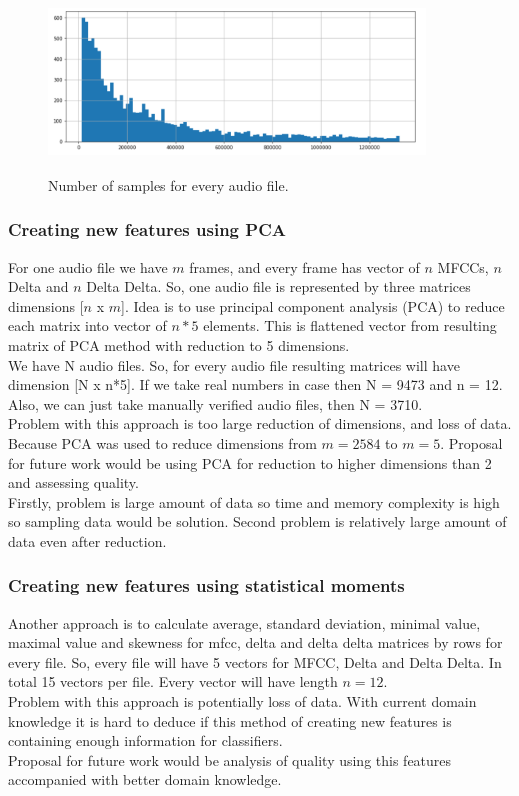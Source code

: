 \documentclass{article}
\begin{document}
\begin{figure}[!htb]
\includegraphics[width=10cm, height=4cm]{noOfSamples}\\
\caption{Number of samples for every audio file.}
\label{fig:distrSamplAudio}
\centering
\end{figure}


\subsubsection{Creating new features using PCA}
For one audio file we have $m$ frames, and every frame has vector of $n$ MFCCs, $n$ Delta and $n$ Delta Delta. So, one 
audio file is represented by three matrices dimensions [$n$ x $m$]. Idea is to use principal component analysis (PCA) to 
reduce each matrix into vector of $n*5$ elements. This is flattened vector from resulting matrix of PCA method with reduction 
to 5 dimensions.\\
We have N audio files. So, for every audio file resulting matrices will have dimension [N x n*5]. If we take real numbers 
in case then N = 9473 and n = 12. Also, we can just take manually verified audio files, then N = 3710.\\
Problem with this approach is too large reduction of dimensions, and loss of data. Because PCA was used to reduce dimensions
from $m=2584$ to $m=5$.
Proposal for future work would be using PCA for reduction to higher dimensions than 2 and assessing quality. \\
Firstly, problem is large amount of data so time and memory complexity is high so sampling data would be solution. Second problem
is relatively large amount of data even after reduction.\\

\subsubsection{Creating new features using statistical moments}
Another approach is to calculate average, standard deviation, minimal value, maximal value and skewness for mfcc,
delta and delta delta matrices by rows for every file. So, every file will have 5 vectors for MFCC, Delta and Delta Delta. 
In total 15 vectors per file. Every vector will have length $n=12$.\\
Problem with this approach is potentially loss of data. With current domain knowledge it is hard to deduce if this method of
creating new features is containing enough information for classifiers.\\
Proposal for future work would be analysis of quality using this features accompanied with better domain knowledge.\\
\end{document}
